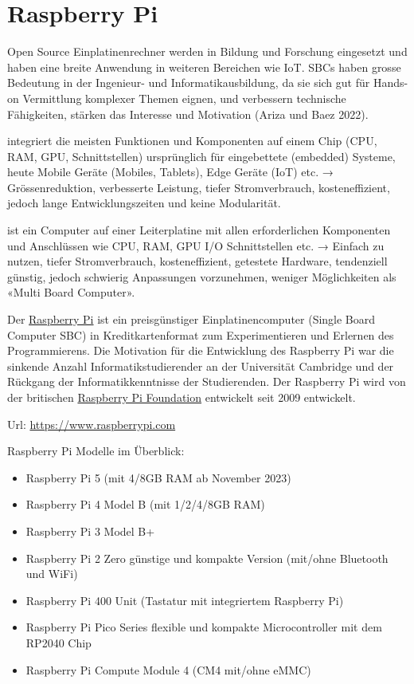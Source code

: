 \documentclass[
  11pt,
  a4paper,
  oneside, openany  ,captions=tableheading
]{scrbook}
\providecommand{\tightlist}{%
  \setlength{\itemsep}{0pt}\setlength{\parskip}{0pt}}
\theoremstyle{remark}
\begin{document}
\chapter{\texorpdfstring{Raspberry
Pi}{Raspberry Pi}}\label{raspberry-pi}

Open Source Einplatinenrechner werden in Bildung und Forschung
eingesetzt und haben eine breite Anwendung in weiteren Bereichen wie
IoT. SBCs haben grosse Bedeutung in der Ingenieur- und
Informatikausbildung, da sie sich gut für Hands-on Vermittlung komplexer
Themen eignen, und verbessern technische Fähigkeiten, stärken das
Interesse und Motivation (Ariza und Baez 2022).

\begin{description}
\tightlist
\item[System on Chip SOC \index{System on Chip SOC}]
integriert die meisten Funktionen und Komponenten auf einem Chip (CPU,
RAM, GPU, Schnittstellen) ursprünglich für eingebettete (embedded)
Systeme, heute Mobile Geräte (Mobiles, Tablets), Edge Geräte (IoT) etc.
→ Grössenreduktion, verbesserte Leistung, tiefer Stromverbrauch,
kosteneffizient, jedoch lange Entwicklungszeiten und keine Modularität.
\item[Single Board Computer SBC \index{Single Board Computer SBC}]
ist ein Computer auf einer Leiterplatine mit allen erforderlichen
Komponenten und Anschlüssen wie CPU, RAM, GPU I/O Schnittstellen etc. →
Einfach zu nutzen, tiefer Stromverbrauch, kosteneffizient, getestete
Hardware, tendenziell günstig, jedoch schwierig Anpassungen vorzunehmen,
weniger Möglichkeiten als «Multi Board Computer».
\end{description}

Der \href{https://www.raspberrypi.com}{Raspberry Pi} ist ein
preisgünstiger Einplatinencomputer (Single Board Computer SBC) in
Kreditkartenformat zum Experimentieren und Erlernen des Programmierens.
Die Motivation für die Entwicklung des Raspberry Pi war die sinkende
Anzahl Informatikstudierender an der Universität Cambridge und der
Rückgang der Informatikkenntnisse der Studierenden. Der Raspberry Pi
wird von der britischen \href{https://www.raspberrypi.org}{Raspberry Pi
Foundation} entwickelt seit 2009 entwickelt.

Url: \url{https://www.raspberrypi.com}

Raspberry Pi Modelle im Überblick:

\begin{itemize}
\tightlist
\item
  Raspberry Pi 5 (mit 4/8GB RAM ab November 2023)
\item
  Raspberry Pi 4 Model B (mit 1/2/4/8GB RAM)
\item
  Raspberry Pi 3 Model B+
\item
  Raspberry Pi 2 Zero günstige und kompakte Version (mit/ohne Bluetooth
  und WiFi)
\item
  Raspberry Pi 400 Unit (Tastatur mit integriertem Raspberry Pi)
\item
  Raspberry Pi Pico Series flexible und kompakte Microcontroller mit dem
  RP2040 Chip
\item
  Raspberry Pi Compute Module 4 (CM4 mit/ohne eMMC)
\end{itemize}
\end{document}
